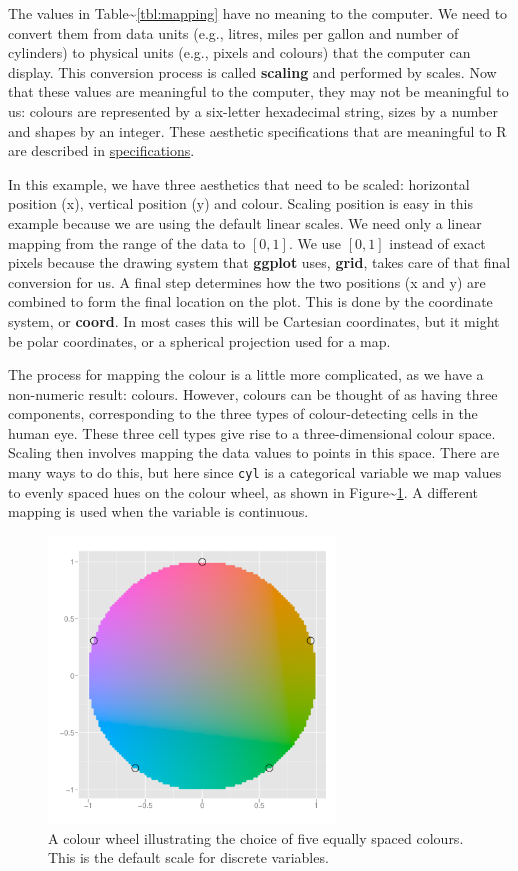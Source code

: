 The values in Table\textasciitilde{}\ref{tbl:mapping} have no meaning to
the computer. We need to convert them from data units (e.g., litres,
miles per gallon and number of cylinders) to physical units (e.g.,
pixels and colours) that the computer can display. This conversion
process is called \textbf{scaling} and performed by scales. Now that
these values are meaningful to the computer, they may not be meaningful
to us: colours are represented by a six-letter hexadecimal string, sizes
by a number and shapes by an integer. These aesthetic specifications
that are meaningful to R are described in
\hyperref[cha:specifications]{specifications}.

In this example, we have three aesthetics that need to be scaled:
horizontal position (x), vertical position (y) and colour. Scaling
position is easy in this example because we are using the default linear
scales. We need only a linear mapping from the range of the data to
\([0, 1]\). We use \([0, 1]\) instead of exact pixels because the
drawing system that \textbf{ggplot} uses, \textbf{grid}, takes care of
that final conversion for us. A final step determines how the two
positions (x and y) are combined to form the final location on the plot.
This is done by the coordinate system, or \textbf{coord}. In most cases
this will be Cartesian coordinates, but it might be polar coordinates,
or a spherical projection used for a map.

The process for mapping the colour is a little more complicated, as we
have a non-numeric result: colours. However, colours can be thought of
as having three components, corresponding to the three types of
colour-detecting cells in the human eye. These three cell types give
rise to a three-dimensional colour space. Scaling then involves mapping
the data values to points in this space. There are many ways to do this,
but here since \texttt{cyl} is a categorical variable we map values to
evenly spaced hues on the colour wheel, as shown in
Figure\textasciitilde{}\ref{fig:colour-wheel}. A different mapping is
used when the variable is continuous. 

\begin{figure}[htbp]
  \centering
    \includegraphics[width=3in]{diagrams/colour-wheel}
  \caption{A colour wheel illustrating the choice of five equally spaced colours. This is the default scale for discrete variables.}
  \label{fig:colour-wheel}
\end{figure}

